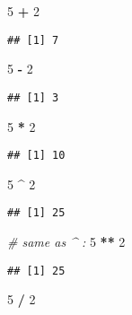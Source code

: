 \documentclass[]{article}
\newenvironment{Shaded}{\begin{snugshade}}{\end{snugshade}}
\newcommand{\DecValTok}[1]{\textcolor[rgb]{0.00,0.00,0.81}{#1}}
\newcommand{\StringTok}[1]{\textcolor[rgb]{0.31,0.60,0.02}{#1}}
\newcommand{\CommentTok}[1]{\textcolor[rgb]{0.56,0.35,0.01}{\textit{#1}}}
\newcommand{\OperatorTok}[1]{\textcolor[rgb]{0.81,0.36,0.00}{\textbf{#1}}}
\begin{document}
\begin{Shaded}
\begin{Highlighting}[]
\DecValTok{5} \OperatorTok{+}\StringTok{ }\DecValTok{2}  
\end{Highlighting}
\end{Shaded}

\begin{verbatim}
## [1] 7
\end{verbatim}

\begin{Shaded}
\begin{Highlighting}[]
\DecValTok{5} \OperatorTok{-}\StringTok{ }\DecValTok{2}  
\end{Highlighting}
\end{Shaded}

\begin{verbatim}
## [1] 3
\end{verbatim}

\begin{Shaded}
\begin{Highlighting}[]
\DecValTok{5} \OperatorTok{*}\StringTok{ }\DecValTok{2}  
\end{Highlighting}
\end{Shaded}

\begin{verbatim}
## [1] 10
\end{verbatim}

\begin{Shaded}
\begin{Highlighting}[]
\DecValTok{5} \OperatorTok{^}\StringTok{ }\DecValTok{2}  
\end{Highlighting}
\end{Shaded}

\begin{verbatim}
## [1] 25
\end{verbatim}

\begin{Shaded}
\begin{Highlighting}[]
\CommentTok{# same as ^ :}
\DecValTok{5} \OperatorTok{**}\StringTok{ }\DecValTok{2}  
\end{Highlighting}
\end{Shaded}

\begin{verbatim}
## [1] 25
\end{verbatim}

\begin{Shaded}
\begin{Highlighting}[]
\DecValTok{5} \OperatorTok{/}\StringTok{ }\DecValTok{2}  
\end{Highlighting}
\end{Shaded}
\end{document}

